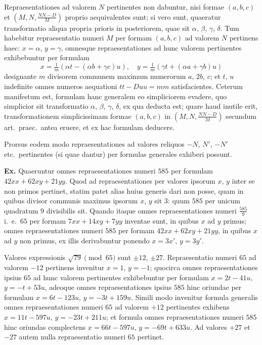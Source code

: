 \documentclass[12pt,a4paper]{article}
\theoremstyle{plain}
\theoremstyle{definition}
\theoremstyle{remark}
\begin{document}
Repraesentationes ad valorem $N$ pertinentes non dabuntur, nisi formae $(a,b,c)$ et $(M,N,\frac{NN-D}{M})$ proprio aequivalentes sunt; si vero sunt, quaeratur transformatio aliqua propria prioris in posteriorem, quae sit $\alpha$, $\beta$, $\gamma$, $\delta$. Tum habebitur repraesentatio numeri $M$ per formam $(a,b,c)$ ad valorem $N$ pertinens haec: $x=\alpha$, $y=\gamma$, omnesque repraesentationes ad hunc valorem pertinentes exhibebuntur per formulam
\[
x=\tfrac{1}{m}(\alpha t-(\alpha b+\gamma c)u),\quad y=\tfrac{1}{m}(\gamma t+(\alpha a+\gamma b)u)
\]
designante $m$ divisorem communem maximum numerorum $a$, $2b$, $c$; et $t$, $u$ indefinite omnes numeros aequationi $tt-Duu=mm$ satisfacientes. Ceterum manifestum est, formulam hanc generalem eo simpliciorem evadere, quo simplicior sit transformatio $\alpha$, $\beta$, $\gamma$, $\delta$, ex qua deducta est; quare haud inutile erit, transformationem simplicissimam formae $(a,b,c)$ in $(M,N,\frac{NN-D}{M})$ secundum art.\ praec.\ antea eruere, et ex hac formulam deducere.

Prorsus eodem modo repraesentationes ad valores reliquos $-N$, $N'$, $-N'$ etc.\ pertinentes (si quae dantur) per formulas generales exhiberi possunt.

\textbf{Ex.}
Quaeruntur omnes repraesentationes numeri $585$ per formulam $42xx+62xy+21yy$. Quod ad repraesentationes per valores ipsorum $x$, $y$ inter se non primos pertinet, statim patet alias huius generis dari non posse, quam in quibus divisor communis maximus ipsorum $x$, $y$ sit $3$: quum $585$ per unicum quadratum $9$ divisibilis sit. Quando itaque omnes repraesentationes numeri $\frac{585}{9}$ i.\ e.\ $65$ per formam $7xx+14xy+7yy$ inventae sunt, in quibus $x$ ad $y$ primus; omnes repraesentationes numeri $585$ per formam $42xx+62xy+21yy$, in quibus $x$ ad $y$ non primus, ex illis derivabuntur ponendo $x=3x'$, $y=3y'$.

Valores expressionis $\sqrt{79} \pmod{65}$ sunt $\pm 12$, $\pm 27$. Repraesentatio numeri $65$ ad valorem $-12$ pertinens invenitur $x=1$, $y=-1$; quocirca omnes repraesentationes ipsius $65$ ad hunc valorem pertinentes exhibebuntur per formulam $x=2t-41u$, $y=-t+53u$, adeoque omnes repraesentationes ipsius $585$ hinc oriundae per formulam $x=6t-123u$, $y=-3t+159u$. Simili modo invenitur formula generalis omnes repraesentationes numeri $65$ ad valorem $+12$ pertinentes exhibens $x=11t-597u$, $y=-23t+211u$; et formula omnes repraesentationes numeri $585$ hinc oriundas complectens $x=66t-597u$, $y=-69t+633u$. Ad valores $+27$ et $-27$ autem nulla repraesentatio numeri $65$ pertinet.
\end{document}
